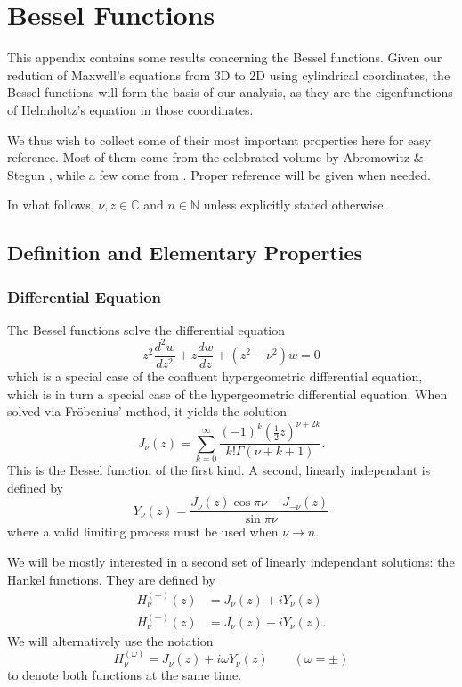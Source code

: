 \chapter{Bessel Functions}
This appendix contains some results concerning the 
Bessel functions. Given our redution of Maxwell's equations 
from 3D to 2D using cylindrical coordinates, the 
Bessel functions will form the basis of our analysis, 
as they are the eigenfunctions of
Helmholtz's equation in those coordinates.

We thus wish to collect some of their most important
properties here for easy reference. Most of them come from the celebrated
volume by Abromowitz \& Stegun \cite{ABR1965}, while a few
come from \cite{CUY2008}. Proper reference will be given when needed. 

In what follows, $\nu,z\in\mathbb{C}$ and $n\in\mathbb{N}$ unless explicitly
stated otherwise.

\section{Definition and Elementary Properties}

\subsection{Differential Equation}
The Bessel functions solve the differential equation
  \begin{equation}
   \label{eq:app.Bessel.diffEquation}
   z^2\frac{d^2w}{dz^2}+z\frac{dw}{dz}+(z^2-\nu^2)w=0
  \end{equation}
which is a special case of the confluent hypergeometric
differential equation, which is in turn a special case
of the hypergeometric differential equation. When solved
via Fröbenius' method, it yields the solution
  \begin{equation}
   \label{eq:app.Bessel.seriesJ}
   J_\nu(z) = \sum_{k=0}^\infty \frac{(-1)^k\left(\frac{1}{2}z\right)^{\nu+2k}}{k!\Gamma(\nu+k+1)}.
  \end{equation}
This is the Bessel function of the first kind. A second, linearly independant
is defined by
  \begin{equation}
   Y_\nu(z) = \frac{J_\nu(z)\cos\pi\nu-J_{-\nu}(z)}{\sin\pi\nu}
  \end{equation}
where a valid limiting process must be used when $\nu\rightarrow n$. 

We will be mostly interested in a second set of linearly independant
solutions: the Hankel functions. They are defined by 
  \begin{subequations}
  \label{eq:app.Bessel.hankelDef}
  \begin{align}
   H_\nu^{(+)}(z)	&= J_\nu(z)+iY_\nu(z)	\\
   H_\nu^{(-)}(z)	&= J_\nu(z)-iY_\nu(z).
  \end{align}
  \end{subequations}
We will alternatively use the notation
  \begin{equation}
   H_\nu^{(\omega)} = J_\nu(z)+i\omega Y_\nu(z)\qquad (\omega=\pm)
  \end{equation}
to denote both functions at the same time.

